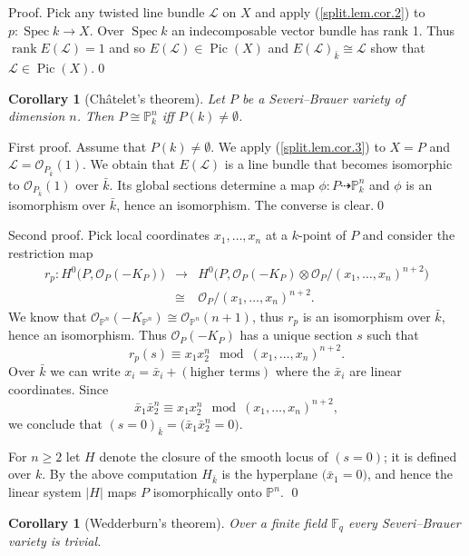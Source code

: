 \documentclass{amsart}
\newtheorem{cor}[thm]{Corollary}
\theoremstyle{definition}
\theoremstyle{remark}
\renewcommand{\o}[0]{{\mathcal O}}
\newcommand{\p}[0]{{\mathbb P}}
\newcommand{\f}[0]{{\mathbb F}}
\newcommand{\map}[0]{\dasharrow}
\newcommand{\spec}[0]{\operatorname{Spec}}
\newcommand{\pic}[0]{\operatorname{Pic}}
\newcommand{\rank}[0]{\operatorname{rank}}
\begin{document}
Proof. 
 Pick any twisted line bundle ${\mathcal L}$ on $X$ and 
apply (\ref{split.lem.cor.2}) to $p:\spec k\to X$.
Over $\spec k$ an indecomposable vector bundle has rank 1. Thus
$\rank E({\mathcal L})=1$ and so $E({\mathcal L})\in \pic(X)$ and 
$E({\mathcal L})_{\bar k}\cong {\mathcal L}$ show that
${\mathcal L}\in \pic(X)$.\qed
\medskip



\begin{cor}[Ch\^atelet's theorem] \label{split.lem.cor.4} Let $P$ be a 
Severi--Brauer variety of dimension $n$. Then $P\cong \p^n_k$ iff $P(k)\neq \emptyset$.
\end{cor}

First proof. Assume that $P(k)\neq \emptyset$. We apply (\ref{split.lem.cor.3}) to  $X=P$ and ${\mathcal L}=\o_{P_{\bar k}}(1)$. 
We obtain that $E({\mathcal L})$ is a line bundle  that becomes
isomorphic to $\o_{P_{\bar k}}(1)$ over $\bar k$. Its global sections determine a map $\phi:P\map \p^n_k$ and $\phi$ is an isomorphism over $\bar k$, hence an isomorphism.
The converse  is clear.\qed
\medskip

Second proof. Pick local coordinates $x_1,\dots, x_n$ at a $k$-point of $P$ and consider the restriction map
$$
\begin{array}{rcl}
r_p:H^0\bigl(P, \o_P(-K_P)\bigr)&\to & 
H^0\bigl(P, \o_P(-K_P)\otimes \o_P/(x_1,\dots, x_n)^{n+2}\bigr)\\
&\cong &
\o_P/(x_1,\dots, x_n)^{n+2}.
\end{array}
$$
We know that   $\o_{\p^n}(-K_{\p^n})\cong \o_{\p^n}(n+1)$,
thus $r_p$ is an isomorphism over $\bar k$, hence an isomorphism.
Thus $\o_P(-K_P)$ has a unique section  $s$ such that 
$$
r_p(s)\equiv x_1x_2^n \mod  (x_1,\dots, x_n)^{n+2}.
$$
Over $\bar k$ we can write  $x_i=\bar x_i+ (\mbox{higher terms})$
where the $\bar x_i$ are linear coordinates. Since
$$
 \bar x_1\bar x_2^n \equiv x_1x_2^n \mod  (x_1,\dots, x_n)^{n+2},
$$
we conclude that $(s=0)_{\bar k}= \bigl(\bar x_1\bar x_2^n =0\bigr)$.

For $n\geq 2$ let $H$ denote the closure of the smooth locus of $(s=0)$; it is defined over $k$. 
By the above computation 
$H_{\bar k}$ is the  hyperplane $\bigl(\bar x_1 =0\bigr)$, and hence the linear system $|H|$ maps $P$ isomorphically onto $\p^n$.  \qed

\medskip

\begin{cor}[Wedderburn's theorem]\label{split.lem.cor.5} Over a finite field $\f_q$ every
Severi--Brauer variety is trivial.
\end{cor}
\end{document}
